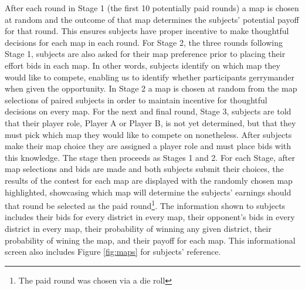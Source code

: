 \documentclass[AER]{AEA}
\begin{document}
After each round in Stage 1 (the first 10 potentially paid rounds) a map is chosen at random and the outcome of that map determines the subjects' potential payoff for that round. This ensures subjects have proper incentive to make thoughtful decisions for each map in each round. For Stage 2, the three rounds following Stage 1, subjects are also asked for their map preference prior to placing their effort bids in each map. In other words, subjects identify on which map they would like to compete, enabling us to identify whether participants gerrymander when given the opportunity. In Stage 2 a map is chosen at random from the map selections of paired subjects in order to maintain incentive for thoughtful decisions on every map. For the next and final round, Stage 3, subjects are told that their player role, Player A or Player B, is not yet determined, but that they must pick which map they would like to compete on nonetheless. After subjects make their map choice they are assigned a player role and must place bids with this knowledge. The stage then proceeds as Stages 1 and 2. For each Stage, after map selections and bids are made and both subjects submit their choices, the results of the contest for each map are displayed with the randomly chosen map highlighted, showcasing which map will determine the subjects' earnings should that round be selected as the paid round\footnote{The paid round was chosen via a die roll}. The information shown to subjects includes their bids for every district in every map, their opponent's bids in every district in every map, their probability of winning any given district, their probability of wining the map, and their payoff for each map. This informational screen also includes Figure \ref{fig:maps} for subjects' reference.
\end{document}
